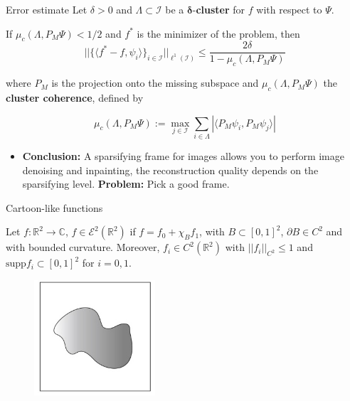 \begin{frame}
\begin{block}{Error estimate}
Let $\delta>0$ and $\Lambda\subset \mathcal{I}$ be a $\mathbf{\delta}$-\textbf{cluster} for $f$ with respect to $\Psi$. 

\bigskip
If $\mu_c(\Lambda, P_M\Psi)<1/2$ and $f^*$ is the minimizer of the problem, then
$$
||\{\langle f^*-f,\psi_i\rangle\}_{i\in\mathcal{I}}||_{\ell^1(\mathcal{I})}\leq \frac{2\delta}{1-\mu_c(\Lambda,P_M\Psi)}
$$

\bigskip
where $P_M$ is the projection onto the missing subspace and $\mu_c(\Lambda,P_M\Psi)$ the \textbf{cluster coherence}, defined by

\bigskip
$$
\mu_c(\Lambda,P_M\Psi) :=\max_{j\in\mathcal{I}} \sum_{i\in \Lambda} |\langle P_M\psi_i,P_M\psi_j\rangle|
$$
\end{block}

\pause
\bigskip

\begin{itemize}
\item \textbf{Conclusion:} A sparsifying frame for images allows you to perform image denoising and inpainting, the reconstruction quality depends on the sparsifying level. \textbf{Problem:} Pick a good frame.
\end{itemize}
\end{frame} 

\begin{frame}{Cartoon-like functions}
\begin{definition}
Let $f:\mathbb{R}^2\longrightarrow\mathbb{C}$, $f\in\mathcal{E}^2(\mathbb{R}^2)$ if $f= f_0+\chi_B f_1$, with $B\subset [0,1]^2$, $\partial B\in C^2$ and with bounded curvature. Moreover, $f_i\in C^2(\mathbb{R}^2)$ with $||f_i||_{C^2}\leq 1$ and $\text{supp} f_i\subset [0,1]^2$ for $i=0,1$. 
\end{definition}
\pause
\begin{figure}[h!]
\centering
\includegraphics[width=0.4\textwidth]{./Images/cartoon-like.jpg}
\end{figure}
\end{frame}

